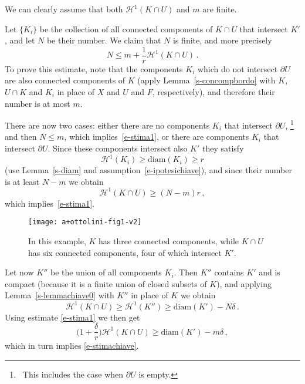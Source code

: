 \documentclass[11pt,reqno,a4paper,final]{amsart}
\makeatletter
\numberwithin{equation}{section}
\theoremstyle{mytheorem}
\theoremstyle{myremark}
\theoremstyle{myparagraph}
\renewenvironment{proof}[1][\proofname]{\par 
  \pushQED{\qed}%
  \normalfont \topsep10\p@\@plus6\p@\relax 
  \trivlist 
  \item[\hskip\labelsep 
    \bfseries 
    #1\@addpunct{.}]\ignorespaces 
}{%
  \popQED\endtrivlist\@endpefalse 
}
\providecommand{\proofname}{Proof}
\newcommand{\footnoteb}[1]{\footnote{~#1}}
\newcommand{\Haus}{\mathscr{H}}
\newcommand{\bd}{\partial}
\newcommand{\diam}{\mathrm{diam}}
\makeatother
\begin{document}
\begin{proof}
We can clearly assume that both $\Haus^1(K\cap U)$ and $m$ are finite.

Let $\{K_i\}$ be the collection of all connected components 
of $K\cap U$ that intersect $K'$, and let $N$ be their number.
We claim that $N$ is finite, and more precisely
%
\begin{equation}
N \le m + \frac{1}{r} \Haus^1(K\cap U)
\, . 
\label{e-stima1}
\end{equation}
%
To prove this estimate, 
note that the components $K_i$ which do not intersect $\bd U$ are 
also connected components of $K$ (apply Lemma~\ref{s-concompbordo}
with $K$, $U\cap K$ and $K_i$ in place of $X$ and $U$ and $F$, respectively), 
and therefore their number is at most $m$. 

There are now two cases:
either there are no components $K_i$ that intersect $\bd U$,%
%
\footnoteb{This includes the case when $\bd U$ is empty.}
% 
and then $N \le m$, which implies~\eqref{e-stima1},
or there are components $K_i$ that intersect $\bd U$.
Since these components intersect also $K'$ they satisfy
\[
\Haus^1(K_i) \ge \diam(K_i) \ge r 
\]
(use Lemma~\ref{s-diam} and assumption~\eqref{e-ipotesichiave}),
and since their number is at least $N-m$ we obtain 
\[
\Haus^1(K\cap U) 
\ge (N - m)r 
\, ,
\]
which implies~\eqref{e-stima1}.

\begin{figure}[h]
\begin{center}
  \texttt{[image: a+ottolini-fig1-v2]}  
  \caption{In this example, $K$ has three connected components, 
  while $K\cap U$ has six connected components, four of which intersect $K'$.} 
  \label{figure1}
\end{center}
\end{figure}

Let now $K''$ be the union of all components $K_i$. 
Then $K''$ contains $K'$ and is compact (because it is 
a finite union of closed subsets of $K$), 
and applying Lemma~\ref{s-lemmachiave0} with $K''$ 
in place of $K$ we obtain
\[
\Haus^1(K\cap U) 
\ge \Haus^1(K'') 
\ge \diam(K') -N\delta
\, .
\]
Using estimate \eqref{e-stima1} we then get
\[
\Big(1 +\frac{\delta}{r} \Big)
\Haus^1(K\cap U) 
\ge \diam(K') -m\delta
\, ,
\]
which in turn implies \eqref{e-stimachiave}.
\end{proof}
\end{document}
